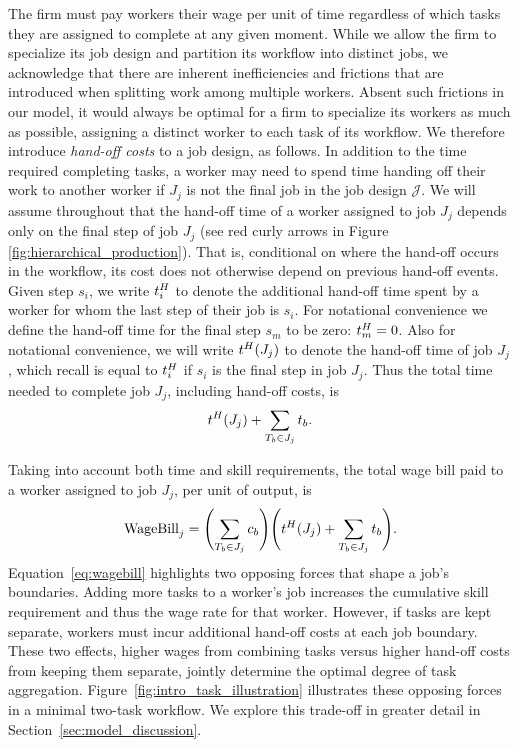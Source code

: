 The firm must pay workers their wage per unit of time regardless of which tasks they are assigned to complete at any given moment.
While we allow the firm to specialize its job design and partition its workflow into distinct jobs, we acknowledge that there are inherent inefficiencies and frictions that are introduced when splitting work among multiple workers.
Absent such frictions in our model, it would always be optimal for a firm to specialize its workers as much as possible, assigning a distinct worker to each task of its workflow. 
We therefore introduce \emph{hand-off costs} to a job design, as follows.
In addition to the time required completing tasks, a worker may need to spend time handing off their work to another worker if $J_j$ is not the final job in the job design $\mathcal{J}$.
We will assume throughout that the hand-off time of a worker assigned to job $J_j$ depends only on the final step of job $J_j$ (see red curly arrows in Figure \ref{fig:hierarchical_production}).
That is, conditional on where the hand-off occurs in the workflow, its cost does not otherwise depend on previous hand-off events.
Given step $s_i$, we write $t^{H}_{i}$ to denote the additional hand-off time spent by a worker for whom the last step of their job is $s_i$.
For notational convenience we define the hand-off time for the final step $s_m$ to be zero: $t^{H}_{m} = 0$.
Also for notational convenience, we will write $t^{H}_{}(J_j)$ to denote the hand-off time of job $J_j$, which recall is equal to $t^{H}_{i}$ if $s_i$ is the final step in job $J_j$.
Thus the total time needed to complete job $J_j$, including hand-off costs, is
\[
t^{H}_{}(J_j) + \sum_{T_b \in J_j} t_{b}.
\]

Taking into account both time and skill requirements, the total wage bill paid to a worker assigned to job $J_j$, per unit of output, is
\begin{align}
\label{eq:wagebill}
\text{WageBill}_j = \Biggl(\sum_{T_b \in J_j} c_{b} \Biggr) \Biggl(t^{H}_{}(J_j) + \sum_{T_b \in J_j} t_{b} \Biggr).
\end{align}
Equation~\eqref{eq:wagebill} highlights two opposing forces that shape a job's boundaries.  
Adding more tasks to a worker's job increases the cumulative skill requirement and thus the wage rate for that worker.  
However, if tasks are kept separate, workers must incur additional hand-off costs at each job boundary.  
These two effects, higher wages from combining tasks versus higher hand-off costs from keeping them separate, jointly determine the optimal degree of task aggregation.  
Figure~\ref{fig:intro_task_illustration} illustrates these opposing forces in a minimal two-task workflow.
We explore this trade-off in greater detail in Section~\ref{sec:model_discussion}.

